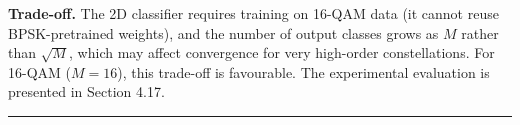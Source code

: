 \textbf{Trade-off.} The 2D classifier requires training on 16-QAM data (it cannot reuse BPSK-pretrained weights), and the number of output classes grows as \(M\) rather than \(\sqrt{M}\), which may affect convergence for very high-order constellations. For 16-QAM (\(M = 16\)), this trade-off is favourable. The experimental evaluation is presented in Section 4.17.

\begin{center}\rule{0.5\linewidth}{0.5pt}\end{center}

